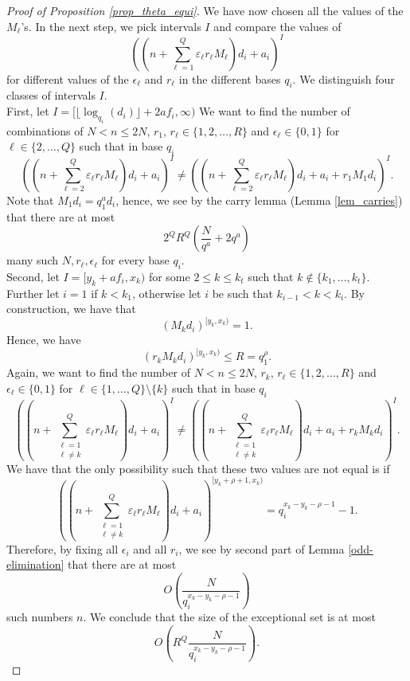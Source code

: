 \documentclass[12pt]{amsart}
\renewcommand{\leq}{\leqslant}
\theoremstyle{definition}
\numberwithin{equation}{section}
\numberwithin{equation}{section}
\begin{document}
\begin{proof}[Proof of Proposition \ref{prop_theta_equi}]
	We have now chosen all the values of the $M_{\ell}$'s. In the next step, we pick intervals $I$ and compare the values of 
	\[
		\left(\left(n+\sum_{\ell = 1}^{Q}\varepsilon_{\ell}r_{\ell}M_{\ell}\right)d_i+a_i\right)^{I}
	\]
	for different values of the $\epsilon_{\ell}$ and $r_{\ell}$ in the different bases $q_i$. We distinguish four classes of intervals $I$.\\
	
	First, let $I=[\lfloor\log_{q_i}(d_i)\rfloor+2af_i,\infty)$ We want to find the number of combinations of $N< n\leq 2N$, $r_1$, $r_{\ell}\in\{1,2,\dots,R\}$ and $\epsilon_{\ell}\in\{0,1\}$ for $\ell \in \{2,\dots, Q\}$ such that in base $q_i$
	\[
		\left(\left(n+\sum_{\ell = 2}^{Q}\varepsilon_{\ell}r_{\ell}M_{\ell}\right)d_i+a_i\right)^{I}
			\neq
		\left(\left(n+\sum_{\ell = 2}^{Q}\varepsilon_{\ell}r_{\ell}M_{\ell}\right)d_i+a_i+r_1M_1d_i\right)^{I}.
	\]
	Note that $M_1d_i=q_1^ad_i $, hence, we see by the carry lemma (Lemma \ref{lem_carries}) that there are at most
	\[
		2^QR^Q\left(\frac{N}{q^a}+2q^a\right)
	\]
	many such $N, r_{\ell}, \epsilon_{\ell}$ for every base $q_i$.\\
	
	Second, let $I=[y_k+af_i,x_k)$ for some $2\leq k\leq k_t$ such that $k\notin \{k_1,\dots, k_{t}\}$. Further let $i=1$ if $k<k_1$, otherwise let $i$ be such that $k_{i-1}<k<k_{i}$. By construction, we have that
	\[
		(M_kd_i)^{[y_k,x_k)} = 1.
	\]
	Hence, we have
	\[
		(r_kM_kd_i)^{[y_k,x_k)} \leq R = q_1^{\rho}.
	\]
	Again, we want to find the number of $N< n\leq 2N$, $r_k$, $r_{\ell}\in\{1,2,\dots,R\}$ and $\epsilon_{\ell}\in\{0,1\}$ for $\ell \in \{1,\dots, Q\}\setminus\{k\}$ such that in base $q_i$
	\[
		\left(\left(n+\sum_{\substack{\ell = 1\\\ell\neq k}}^{Q}\varepsilon_{\ell}r_{\ell}M_{\ell}\right)d_i+a_i\right)^{I}
				\neq
		\left(\left(n+\sum_{\substack{\ell = 1\\\ell\neq k}}^{Q}\varepsilon_{\ell}r_{\ell}M_{\ell}\right)d_i+a_i+r_{k}M_{k}d_i\right)^{I}.
	\]	
	We have that the only possibility such that these two values are not equal is if
	\[
		\left(\left(n+\sum_{\substack{\ell = 1\\\ell\neq k}}^{Q}\varepsilon_{\ell}r_{\ell}M_{\ell}\right) d_i +a_i\right)^{[y_k+\rho+1,x_k)} = q_i^{x_k-y_k-\rho-1}-1.
	\]
	Therefore, by fixing all $\epsilon_i$ and all $r_i$, we see by second part of Lemma \ref{odd-elimination} that there are at most
	\[
		O\left(\frac{N}{q_i^{x_k-y_k-\rho-1}}\right)
	\]
	such numbers $n$. We conclude that the size of the exceptional set is at most
	\[
		O\left(R^Q\frac{N}{q_i^{x_k-y_k-\rho-1}}\right).
	\]
	

\end{proof}
\end{document}
